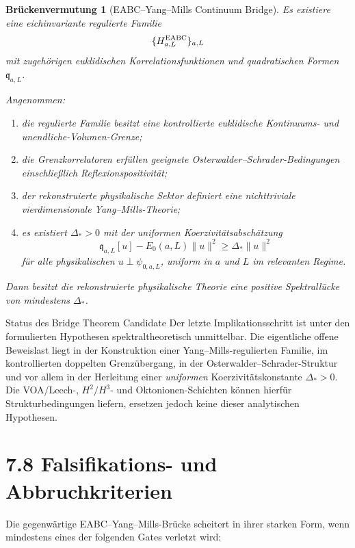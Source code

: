 \documentclass[11pt,a4paper]{article}
\newtheorem{vermutung}{Brückenvermutung}
\begin{document}
\begin{vermutung}[EABC--Yang--Mills Continuum Bridge]
Es existiere eine eichinvariante regulierte Familie
\[
\{H_{a,L}^{\rm EABC}\}_{a,L}
\]
mit zugehörigen euklidischen Korrelationsfunktionen und quadratischen Formen
$\mathfrak q_{a,L}$.

Angenommen:

\begin{enumerate}[label=(\roman*)]
\item die regulierte Familie besitzt eine kontrollierte euklidische
Kontinuums- und unendliche-Volumen-Grenze;

\item die Grenzkorrelatoren erfüllen geeignete
Osterwalder--Schrader-Bedingungen einschließlich Reflexionspositivität;

\item der rekonstruierte physikalische Sektor definiert eine nichttriviale
vierdimensionale Yang--Mills-Theorie;

\item es existiert $\Delta_*>0$ mit der uniformen Koerzivitätsabschätzung
\[
\mathfrak q_{a,L}[u]-E_0(a,L)\|u\|^2
\ge
\Delta_*\|u\|^2
\]
für alle physikalischen
$u\perp\psi_{0,a,L}$,
uniform in $a$ und $L$ im relevanten Regime.
\end{enumerate}

Dann besitzt die rekonstruierte physikalische Theorie eine positive
Spektrallücke von mindestens $\Delta_*$.
\end{vermutung}

\begin{statusbox}{Status des Bridge Theorem Candidate}
Der letzte Implikationsschritt ist unter den formulierten Hypothesen
spektraltheoretisch unmittelbar. Die eigentliche offene Beweislast liegt in
der Konstruktion einer Yang--Mills-regulierten Familie, im kontrollierten
doppelten Grenzübergang, in der Osterwalder--Schrader-Struktur und vor allem
in der Herleitung einer \emph{uniformen} Koerzivitätskonstante $\Delta_*>0$.
Die VOA/Leech-, $H^2/H^3$- und Oktonionen-Schichten können hierfür
Strukturbedingungen liefern, ersetzen jedoch keine dieser analytischen
Hypothesen.
\end{statusbox}

\section*{7.8 Falsifikations- und Abbruchkriterien}

Die gegenwärtige EABC--Yang--Mills-Brücke scheitert in ihrer starken Form,
wenn mindestens eines der folgenden Gates verletzt wird:
\end{document}
